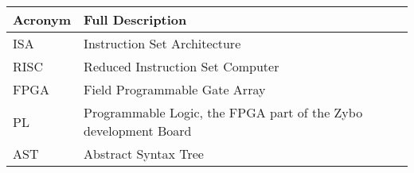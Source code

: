 \begin{table}[H]
	\begin{tabularx}{\textwidth}{| a | x |}
		\hline
		\textbf{Acronym} & \textbf{Full Description}                                       \\
		\hline
		ISA              & Instruction Set Architecture                                    \\
		RISC             & Reduced Instruction Set Computer                                \\
		FPGA             & Field Programmable Gate Array                                   \\
		PL               & Programmable Logic, the FPGA part of the Zybo development Board \\
		AST				 & Abstract Syntax Tree                                            \\
		\hline
	\end{tabularx}
\end{table}

